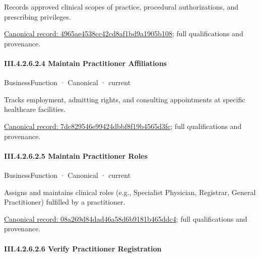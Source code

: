 Records approved clinical scopes of practice, procedural authorizations, and prescribing privileges.


{\footnotesize \href{../../../../continuum/business/business-function/4965ae4538cc42cd8af1bd9a1905b108.md}{Canonical record: 4965ae4538cc42cd8af1bd9a1905b108}; full qualifications and provenance.}\par
\paragraph*{III.4.2.6.2.4 Maintain Practitioner Affiliations}
\label{navigation:III.4.2.6.2.4}

\label{element:7dc829546e99424dbbf8f19b4565d3fc}
{\small BusinessFunction · Canonical · current}\par

Tracks employment, admitting rights, and consulting appointments at specific healthcare facilities.


{\footnotesize \href{../../../../continuum/business/business-function/7dc829546e99424dbbf8f19b4565d3fc.md}{Canonical record: 7dc829546e99424dbbf8f19b4565d3fc}; full qualifications and provenance.}\par
\paragraph*{III.4.2.6.2.5 Maintain Practitioner Roles}
\label{navigation:III.4.2.6.2.5}

\label{element:08a269d84dad46a58d6b9181b465ddc4}
{\small BusinessFunction · Canonical · current}\par

Assigns and maintains clinical roles (e.g., Specialist Physician, Registrar, General Practitioner) fulfilled by a practitioner.


{\footnotesize \href{../../../../continuum/business/business-function/08a269d84dad46a58d6b9181b465ddc4.md}{Canonical record: 08a269d84dad46a58d6b9181b465ddc4}; full qualifications and provenance.}\par
\paragraph*{III.4.2.6.2.6 Verify Practitioner Registration}
\label{navigation:III.4.2.6.2.6}

